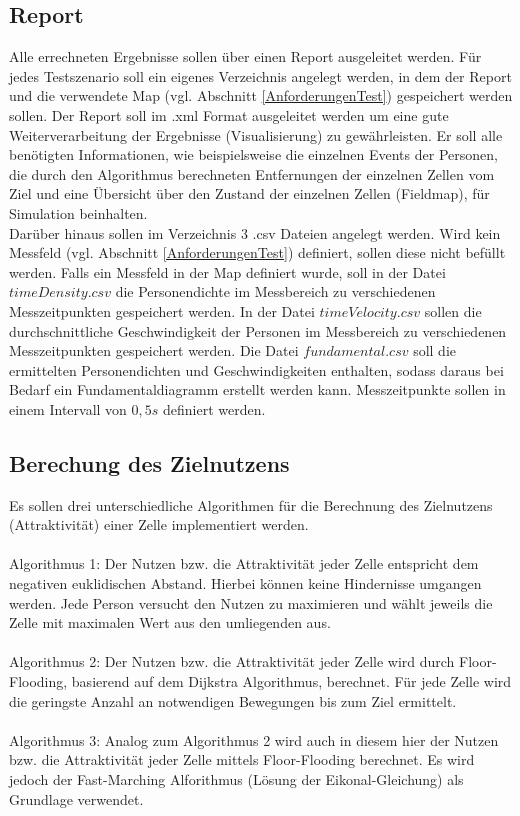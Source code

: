 \subsection{Report}
\label{Anforderungen:Report}
Alle errechneten Ergebnisse sollen über einen Report ausgeleitet werden. Für jedes Testszenario soll ein eigenes Verzeichnis angelegt werden, in dem der Report und die verwendete Map (vgl. Abschnitt \ref{AnforderungenTest}) gespeichert werden sollen. Der Report soll im .xml Format ausgeleitet werden um eine gute Weiterverarbeitung der Ergebnisse (Visualisierung) zu gewährleisten. Er soll alle benötigten Informationen, wie beispielsweise die einzelnen Events der Personen, die durch den Algorithmus berechneten Entfernungen der einzelnen Zellen vom Ziel und eine Übersicht über den Zustand der einzelnen Zellen (Fieldmap), für Simulation beinhalten. \\
Darüber hinaus sollen im Verzeichnis 3 .csv Dateien angelegt werden. Wird kein Messfeld (vgl. Abschnitt \ref{AnforderungenTest}) definiert, sollen diese nicht befüllt werden. Falls ein Messfeld in der Map definiert wurde, soll in der Datei $timeDensity.csv$ die Personendichte im Messbereich zu verschiedenen Messzeitpunkten gespeichert werden. In der Datei $timeVelocity.csv$ sollen die durchschnittliche Geschwindigkeit der Personen im Messbereich zu verschiedenen Messzeitpunkten gespeichert werden. Die Datei $fundamental.csv$ soll die ermittelten Personendichten und Geschwindigkeiten enthalten, sodass daraus bei Bedarf ein Fundamentaldiagramm erstellt werden kann. Messzeitpunkte sollen in einem Intervall von $0,5s$ definiert werden.\\

\subsection{Berechung des Zielnutzens}
\label{AnforderungenAlgorithmen}

Es sollen drei unterschiedliche Algorithmen für die Berechnung des Zielnutzens (Attraktivität) einer Zelle implementiert werden. \\
\\
Algorithmus 1: Der Nutzen bzw. die Attraktivität jeder Zelle entspricht dem negativen euklidischen Abstand. Hierbei können keine Hindernisse umgangen werden. Jede Person versucht den Nutzen zu maximieren und wählt jeweils die Zelle mit maximalen Wert aus den umliegenden aus.\\
\\
Algorithmus 2: Der Nutzen bzw. die Attraktivität jeder Zelle wird durch Floor-Flooding, basierend auf dem Dijkstra Algorithmus, berechnet. Für jede Zelle wird die geringste Anzahl an notwendigen Bewegungen bis zum Ziel ermittelt. \\
\\
Algorithmus 3: Analog zum Algorithmus 2 wird auch in diesem hier der Nutzen bzw. die Attraktivität jeder Zelle mittels Floor-Flooding berechnet. Es wird jedoch der Fast-Marching Alforithmus (Lösung der Eikonal-Gleichung) als Grundlage verwendet.

